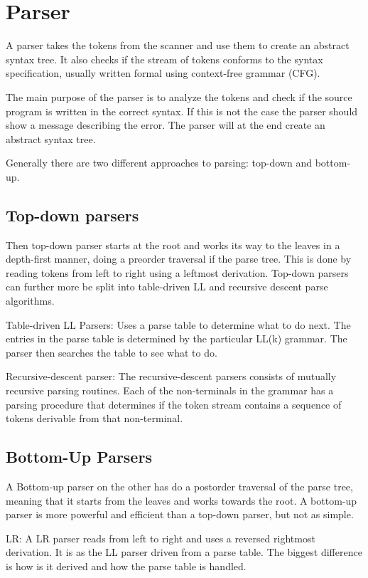 \section{Parser}
A parser takes the tokens from the scanner and use them to create an abstract syntax tree. It also checks if the stream of tokens conforms to the syntax specification, usually written formal using context-free grammar (CFG).

The main purpose of the parser is to analyze the tokens and check if the source program is written in the correct syntax. If this is not the case the parser should show a message describing the error. The parser will at the end create an abstract syntax tree. 

Generally there are two different approaches to parsing: top-down and bottom-up.

\subsection*{Top-down parsers}
Then top-down parser starts at the root and works its way to the leaves in a depth-first manner, doing a preorder traversal if the parse tree.  This is done by reading tokens from left to right using a leftmost derivation. Top-down parsers can further more be split into table-driven LL  and recursive descent parse algorithms.

Table-driven LL Parsers:
Uses a parse table to determine what to do next. The entries in the parse table is determined by the particular LL(k) grammar. The parser then searches the table to see what to do.

Recursive-descent parser:
The recursive-descent parsers consists of mutually recursive parsing routines. Each of the non-terminals in the grammar has a parsing procedure that determines if the token stream contains a sequence of tokens derivable from that non-terminal.

\subsection*{Bottom-Up Parsers}

A Bottom-up parser on the other has do a postorder traversal of the parse tree, meaning that it starts from the leaves and works towards the root.
A bottom-up parser is more powerful and efficient than a top-down parser, but not as simple.

LR:
A LR parser reads from left to right and uses a reversed rightmost derivation. It is as the LL parser driven from a parse table. The biggest difference is how is it derived and how the parse table is handled.  


